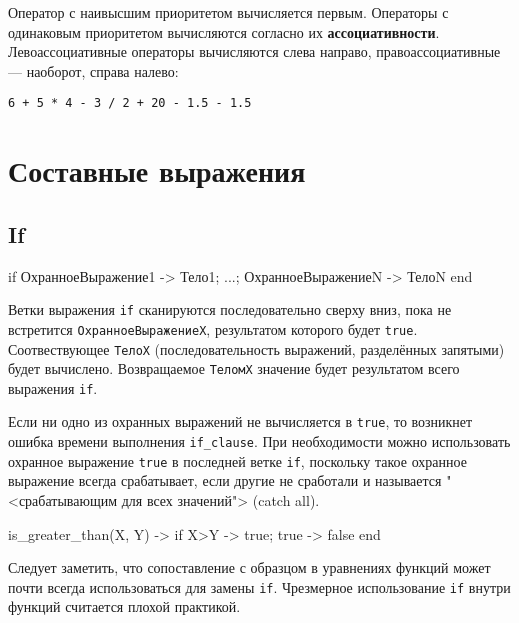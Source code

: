 Оператор с наивысшим приоритетом вычисляется первым. Операторы с одинаковым 
приоритетом вычисляются согласно их \textbf{ассоциативности}. Левоассоциативные
операторы вычисляются слева направо, правоассоциативные --- наоборот, справа
налево:

\texttt{6 + 5 * 4 - 3 / 2   + 20 - 1.5   - 1.5  
	}



\section{Составные выражения}


\subsection{If}

\begin{erlangru}
if
    ОхранноеВыражение1 ->
        Тело1;
    ...;
    ОхранноеВыражениеN ->
        ТелоN      %
end
\end{erlangru}

Ветки выражения \texttt{if} сканируются последовательно сверху вниз, пока не 
встретится \texttt{ОхранноеВыражениеX}, результатом которого будет
\texttt{true}. Соотвествующее \texttt{ТелоX} (последовательность выражений,
разделённых  запятыми) будет вычислено. Возвращаемое \texttt{ТеломX} значение
будет результатом всего выражения \texttt{if}.

Если ни одно из охранных выражений не вычисляется в \texttt{true}, то возникнет
ошибка времени выполнения \texttt{if\_clause}. При необходимости можно 
использовать\linebreak
охранное выражение \texttt{true} в последней ветке \texttt{if}, 
поскольку такое охранное выражение всегда срабатывает, если другие не сработали 
и называется "<срабатывающим для всех значений"> (catch all).

\begin{erlang}
is_greater_than(X, Y) ->
    if
        X>Y ->
            true;
        true ->                 %
            false
    end
\end{erlang}

Следует заметить, что сопоставление с образцом в уравнениях функций может почти
всегда использоваться для замены \texttt{if}. Чрезмерное использование 
\texttt{if} внутри функций считается плохой практикой.


